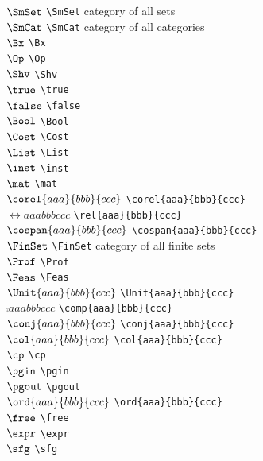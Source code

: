 \documentclass[11pt, book]{memoir}
\begin{document}
\begin{multicols}{2}
$\SmSet$ \verb|\SmSet| category of all sets \\
$\SmCat$ \verb|\SmCat| category of all categories \\
$\Bx$ \verb|\Bx| \\
$\Op$ \verb|\Op| \\
$\Shv$ \verb|\Shv| \\
$\true$ \verb|\true| \\
$\false$ \verb|\false| \\
$\Bool$ \verb|\Bool| \\
$\Cost$ \verb|\Cost| \\
$\List$ \verb|\List| \\
$\inst$ \verb|\inst| \\
$\mat$ \verb|\mat| \\
$\corel{aaa}{bbb}{ccc}$ \verb|\corel{aaa}{bbb}{ccc}| \\
$\rel{aaa}{bbb}{ccc}$ \verb|\rel{aaa}{bbb}{ccc}| \\
$\cospan{aaa}{bbb}{ccc}$ \verb|\cospan{aaa}{bbb}{ccc}| \\
$\FinSet$ \verb|\FinSet| category of all finite sets \\
$\Prof$ \verb|\Prof| \\
$\Feas$ \verb|\Feas| \\
$\Unit{aaa}{bbb}{ccc}$ \verb|\Unit{aaa}{bbb}{ccc}| \\
$\comp{aaa}{bbb}{ccc}$ \verb|\comp{aaa}{bbb}{ccc}| \\
$\conj{aaa}{bbb}{ccc}$ \verb|\conj{aaa}{bbb}{ccc}| \\
$\col{aaa}{bbb}{ccc}$ \verb|\col{aaa}{bbb}{ccc}| \\
$\cp$ \verb|\cp| \\
$\pgin$ \verb|\pgin| \\
$\pgout$ \verb|\pgout| \\
$\ord{aaa}{bbb}{ccc}$ \verb|\ord{aaa}{bbb}{ccc}| \\
$\free$ \verb|\free| \\
$\expr$ \verb|\expr| \\
$\sfg$ \verb|\sfg| \\

\end{multicols}
\end{document}
